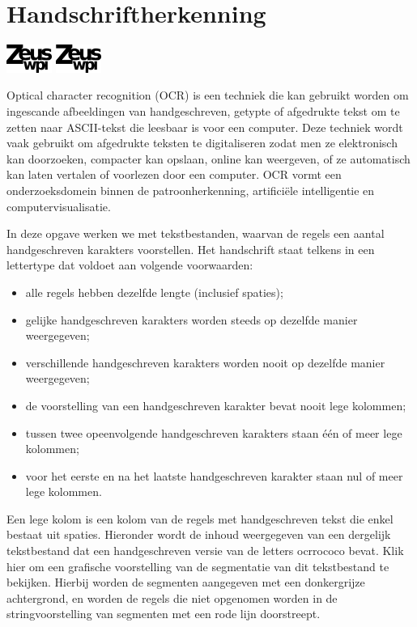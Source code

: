 
\section*{Handschriftherkenning}
\flushright
\includegraphics[width=4em]{logo-new.png}
\includegraphics[width=4em]{logo-new.png}
\flushleft

Optical character recognition (OCR) is een techniek die kan gebruikt worden om
ingescande afbeeldingen van handgeschreven, getypte of afgedrukte tekst om te
zetten naar ASCII-tekst die leesbaar is voor een computer. Deze techniek wordt
vaak gebruikt om afgedrukte teksten te digitaliseren zodat men ze elektronisch
kan doorzoeken, compacter kan opslaan, online kan weergeven, of ze automatisch
kan laten vertalen of voorlezen door een computer. OCR vormt een
onderzoeksdomein binnen de patroonherkenning, artifici\"ele intelligentie en
computervisualisatie.

In deze opgave werken we met tekstbestanden, waarvan de regels een aantal
handgeschreven karakters voorstellen. Het handschrift staat telkens in een
lettertype dat voldoet aan volgende voorwaarden:

\begin{itemize}
    \item alle regels hebben dezelfde lengte (inclusief spaties);
    \item gelijke handgeschreven karakters worden steeds op dezelfde manier
        weergegeven;
    \item verschillende handgeschreven karakters worden nooit op dezelfde manier
        weergegeven;
    \item de voorstelling van een handgeschreven karakter bevat nooit lege
        kolommen;
    \item tussen twee opeenvolgende handgeschreven karakters staan \'e\'en of
        meer lege kolommen;
    \item voor het eerste en na het laatste handgeschreven karakter staan nul of
        meer lege kolommen.
\end{itemize}

Een lege kolom is een kolom van de regels met handgeschreven tekst die enkel
bestaat uit spaties. Hieronder wordt de inhoud weergegeven van een dergelijk
tekstbestand dat een handgeschreven versie van de letters ocrrococo bevat. Klik
hier om een grafische voorstelling van de segmentatie van dit tekstbestand te
bekijken. Hierbij worden de segmenten aangegeven met een donkergrijze
achtergrond, en worden de regels die niet opgenomen worden in de
stringvoorstelling van segmenten met een rode lijn doorstreept.

